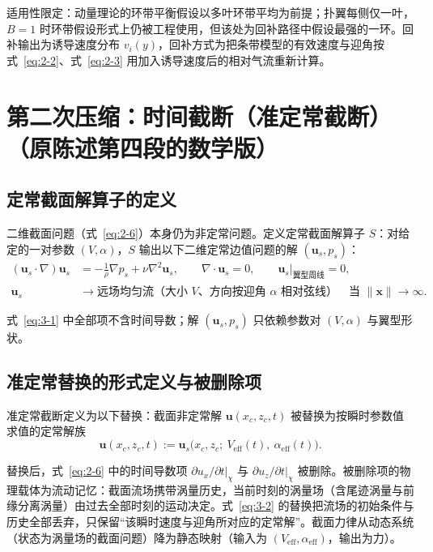 \documentclass[11pt,a4paper]{ctexart}
\numberwithin{equation}{section}
\begin{document}
适用性限定：动量理论的环带平衡假设以多叶环带平均为前提；扑翼每侧仅一叶，$B = 1$ 时环带假设形式上仍被工程使用，但该处为回补路径中假设最强的一环。回补输出为诱导速度分布 $v_i(y)$，回补方式为把条带模型的有效速度与迎角按式~\eqref{eq:2-2}、式~\eqref{eq:2-3} 用加入诱导速度后的相对气流重新计算。

\section{第二次压缩：时间截断（准定常截断）（原陈述第四段的数学版）}\label{sec:quasi}

\subsection{定常截面解算子的定义}

二维截面问题（式~\eqref{eq:2-6}）本身仍为非定常问题。定义定常截面解算子 $S$：对给定的一对参数 $(V, \alpha)$，$S$ 输出以下二维定常边值问题的解 $(\bm{u}_s, p_s)$：
\begin{equation}
\begin{split}
  (\bm{u}_s\cdot\nabla)\bm{u}_s &= -\frac{1}{\rho}\nabla p_s + \nu\nabla^2\bm{u}_s, \qquad
  \nabla\cdot\bm{u}_s = 0, \qquad \bm{u}_s\big|_{\text{翼型周线}} = 0,\\
  \bm{u}_s &\to \text{远场均匀流（大小 } V \text{、方向按迎角 } \alpha \text{ 相对弦线）}\quad \text{当 } \|\bm{x}\| \to \infty.
\end{split}
\label{eq:3-1}
\end{equation}

式~\eqref{eq:3-1} 中全部项不含时间导数；解 $(\bm{u}_s, p_s)$ 只依赖参数对 $(V, \alpha)$ 与翼型形状。

\subsection{准定常替换的形式定义与被删除项}

准定常截断定义为以下替换：截面非定常解 $\bm{u}(x_c, z_c, t)$ 被替换为按瞬时参数值求值的定常解族
\begin{equation}
  \bm{u}(x_c, z_c, t) := \bm{u}_s\bigl(x_c, z_c;\ V_{\text{eff}}(t),\ \alpha_{\text{eff}}(t)\bigr). \label{eq:3-2}
\end{equation}

替换后，式~\eqref{eq:2-6} 中的时间导数项 $\partial u_x/\partial t|_\chi$ 与 $\partial u_z/\partial t|_\chi$ 被删除。被删除项的物理载体为流动记忆：截面流场携带涡量历史，当前时刻的涡量场（含尾迹涡量与前缘分离涡量）由过去全部时刻的运动决定。式~\eqref{eq:3-2} 的替换把流场的初始条件与历史全部丢弃，只保留“该瞬时速度与迎角所对应的定常解”。截面力律从动态系统（状态为涡量场的截面问题）降为静态映射（输入为 $(V_{\text{eff}}, \alpha_{\text{eff}})$，输出为力）。
\end{document}
